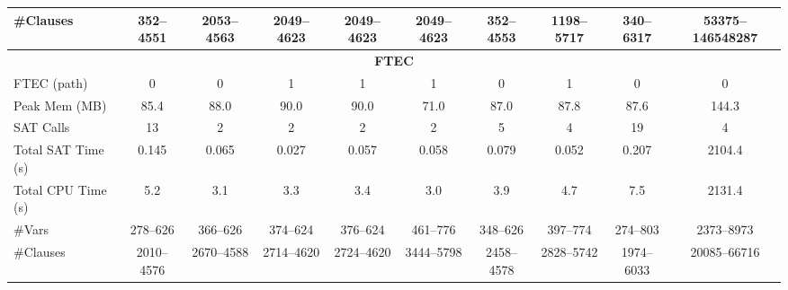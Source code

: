 \begin{table}[!htbp]
{\begin{tabular}{l ccccccccc}
\#Clauses & 352--4551 & 2053--4563 & 2049--4623 & 2049--4623 & 2049--4623 & 352--4553 & 1198--5717 & 340--6317 & 53375--146548287 \\
\midrule
\multicolumn{10}{c}{\textbf{FTEC}} \\
\midrule
FTEC (path) & 0 & 0 & 1 & 1 & 1 & 0 & 1 & 0 & 0 \\
Peak Mem (MB) & 85.4 & 88.0 & 90.0 & 90.0 & 71.0 & 87.0 & 87.8 & 87.6 & 144.3 \\
SAT Calls & 13 & 2 & 2 & 2 & 2 & 5 & 4 & 19 & 4 \\
Total SAT Time (s) & 0.145 & 0.065 & 0.027 & 0.057 & 0.058 & 0.079 & 0.052 & 0.207 & 2104.4 \\
Total CPU Time (s) & 5.2 & 3.1 & 3.3 & 3.4 & 3.0 & 3.9 & 4.7 & 7.5 & 2131.4 \\
\#Vars & 278--626 & 366--626 & 374--624 & 376--624 & 461--776 & 348--626 & 397--774 & 274--803 & 2373--8973 \\
\#Clauses & 2010--4576 & 2670--4588 & 2714--4620 & 2724--4620 & 3444--5798 & 2458--4578 & 2828--5742 & 1974--6033 & 20085--66716 \\
\bottomrule
\end{tabular}%
}

\vspace*{1.5em} %


\end{table}
